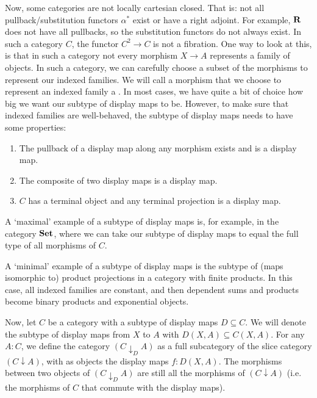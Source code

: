 Now, some categories are not locally cartesian closed. That is: not all pullback/substitution functors $ \alpha^* $ exist or have a right adjoint. For example, $ \mathbf{R} $ does not have all pullbacks, so the substitution functors do not always exist. In such a category $ C $, the functor $ C^2 \to C $ is not a fibration. One way to look at this, is that in such a category not every morphism $ X \to A $ represents a family of objects. In such a category, we can carefully choose a subset of the morphisms to represent our indexed families. We will call a morphism that we choose to represent an indexed family a . In most cases, we have quite a bit of choice how big we want our subtype of display maps to be. However, to make sure that indexed families are well-behaved, the subtype of display maps needs to have some properties:
\begin{enumerate}
  \item The pullback of a display map along any morphism exists and is a display map.
  \item The composite of two display maps is a display map.
  \item $ C $ has a terminal object and any terminal projection is a display map.
\end{enumerate}
\begin{remark}
  A `maximal' example of a subtype of display maps is, for example, in the category $ \mathbf{Set} $, where we can take our subtype of display maps to equal the full type of all morphisms of $ C $.
\end{remark}
\begin{remark}
  A `minimal' example of a subtype of display maps is the subtype of (maps isomorphic to) product projections in a category with finite products. In this case, all indexed families are constant, and then dependent sums and products become binary products and exponential objects.
\end{remark}

Now, let $ C $ be a category with a subtype of display maps $ D \subseteq C $. We will denote the subtype of display maps from $ X $ to $ A $ with $ D(X, A) \subseteq C(X, A) $. For any $ A : C $, we define the category $ (C \downarrow_D A) $ as a full subcategory of the slice category $ (C \downarrow A) $, with as objects the display maps $ f: D(X, A) $. The morphisms between two objects of $ (C \downarrow_D A) $ are still all the morphisms of $ (C \downarrow A) $ (i.e. the morphisms of $ C $ that commute with the display maps).

